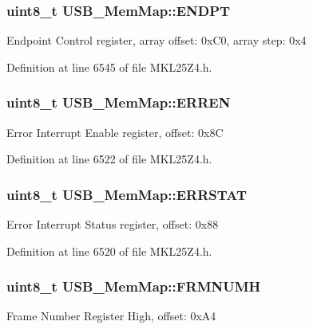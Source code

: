 \subsubsection[{\texorpdfstring{E\+N\+D\+PT}{ENDPT}}]{\setlength{\rightskip}{0pt plus 5cm}uint8\+\_\+t U\+S\+B\+\_\+\+Mem\+Map\+::\+E\+N\+D\+PT}\hypertarget{struct_u_s_b___mem_map_a86aaba02227a45a333f72565b0bec378}{}\label{struct_u_s_b___mem_map_a86aaba02227a45a333f72565b0bec378}
Endpoint Control register, array offset\+: 0x\+C0, array step\+: 0x4 

Definition at line 6545 of file M\+K\+L25\+Z4.\+h.

\subsubsection[{\texorpdfstring{E\+R\+R\+EN}{ERREN}}]{\setlength{\rightskip}{0pt plus 5cm}uint8\+\_\+t U\+S\+B\+\_\+\+Mem\+Map\+::\+E\+R\+R\+EN}\hypertarget{struct_u_s_b___mem_map_a810f265a9ad6dc0f51834d0cecf24a79}{}\label{struct_u_s_b___mem_map_a810f265a9ad6dc0f51834d0cecf24a79}
Error Interrupt Enable register, offset\+: 0x8C 

Definition at line 6522 of file M\+K\+L25\+Z4.\+h.

\subsubsection[{\texorpdfstring{E\+R\+R\+S\+T\+AT}{ERRSTAT}}]{\setlength{\rightskip}{0pt plus 5cm}uint8\+\_\+t U\+S\+B\+\_\+\+Mem\+Map\+::\+E\+R\+R\+S\+T\+AT}\hypertarget{struct_u_s_b___mem_map_ad86f18ee95df11168d4b6cf68578e0fa}{}\label{struct_u_s_b___mem_map_ad86f18ee95df11168d4b6cf68578e0fa}
Error Interrupt Status register, offset\+: 0x88 

Definition at line 6520 of file M\+K\+L25\+Z4.\+h.

\subsubsection[{\texorpdfstring{F\+R\+M\+N\+U\+MH}{FRMNUMH}}]{\setlength{\rightskip}{0pt plus 5cm}uint8\+\_\+t U\+S\+B\+\_\+\+Mem\+Map\+::\+F\+R\+M\+N\+U\+MH}\hypertarget{struct_u_s_b___mem_map_a9df319e9feb132fdd9caa55264acfc30}{}\label{struct_u_s_b___mem_map_a9df319e9feb132fdd9caa55264acfc30}
Frame Number Register High, offset\+: 0x\+A4 

